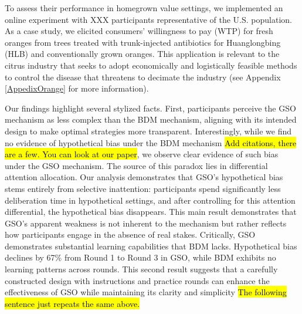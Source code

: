 \documentclass[12pt]{article}
\begin{document}
To assess their performance in homegrown value settings, we implemented an online experiment with XXX participants representative of the U.S. population. As a case study, we elicited consumers' willingness to pay (WTP) for fresh oranges from trees treated with trunk-injected antibiotics for Huanglongbing (HLB) and conventionally grown oranges. This application is relevant to the citrus industry that seeks to adopt economically and logistically feasible methods to control the disease that threatens to decimate the industry  (see Appendix \ref{AppedixOrange} for more information). 

Our findings highlight several stylized facts. First, participants perceive the GSO mechanism as less complex than the BDM mechanism, aligning with its intended design to make optimal strategies more transparent. Interestingly, while we find no evidence of hypothetical bias under the BDM mechanism \hl{Add citations, there are a few. You can look at our paper}, we observe clear evidence of such bias under the GSO mechanism. 
The source of this paradox lies in differential attention allocation. Our analysis demonstrates that GSO's hypothetical bias stems entirely from selective inattention: participants spend significantly less deliberation time in hypothetical settings, and after controlling for this attention differential, the hypothetical bias disappears. This main result demonstrates that GSO's apparent weakness is not inherent to the mechanism but rather reflects how participants engage in the absence of real stakes. Critically, GSO demonstrates substantial learning capabilities that BDM lacks. Hypothetical bias declines by 67\% from Round 1 to Round 3 in GSO, while BDM exhibits no learning patterns across rounds. This second result suggests that a carefully constructed design with instructions and practice rounds can enhance the effectiveness of GSO while maintaining its clarity and simplicity \hl{The following sentence just repeats the same above.}%
\end{document}
